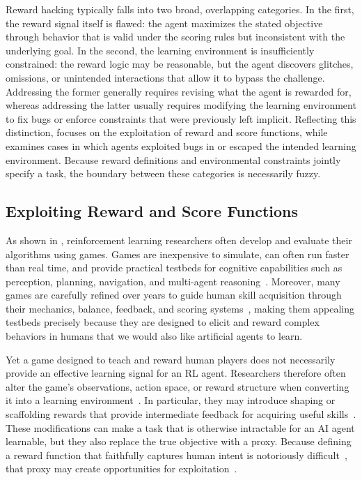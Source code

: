 \documentclass[10pt]{article}
\def\citep#1{}%
\begin{document}
Reward hacking typically falls into two broad, overlapping categories.
In the first, the reward signal itself is flawed: the agent maximizes the stated objective through behavior that is valid under the scoring rules but inconsistent with the underlying goal.
In the second, the learning environment is insufficiently constrained: the reward logic may be reasonable, but the agent discovers glitches, omissions, or unintended interactions that allow it to bypass the challenge.
Addressing the former generally requires revising what the agent is rewarded for, whereas addressing the latter usually requires modifying the learning environment to fix bugs or enforce constraints that were previously left implicit.
Reflecting this distinction,  focuses on the exploitation of reward and score functions, while  examines cases in which agents exploited bugs in or escaped the intended learning environment.
Because reward definitions and environmental constraints jointly specify a task, the boundary between these categories is necessarily fuzzy.

\subsection{Exploiting Reward and Score Functions}
\label{rewardHacking}

As shown in , reinforcement learning researchers often develop and evaluate their algorithms using games.
Games are inexpensive to simulate, can often run faster than real time, and provide practical testbeds for cognitive capabilities such as perception, planning, navigation, and multi-agent reasoning~\citep{schaul2011measuringintelligencegames}.
Moreover, many games are carefully refined over years to guide human skill acquisition through their mechanics, balance, feedback, and scoring systems~\citep{jaccardcolabgamedev, gee2003video, Plass2015gamelearning}, making them appealing testbeds precisely because they are designed to elicit and reward complex behaviors in humans that we would also like artificial agents to learn.

Yet a game designed to teach and reward human players does not necessarily provide an effective learning signal for an RL agent.
Researchers therefore often alter the game's observations, action space, or reward structure when converting it into a learning environment~\citep{yannakakis2025artificial}.
In particular, they may introduce shaping or scaffolding rewards that provide intermediate feedback for acquiring useful skills~\citep{ibrahim2024comprehensiveoverviewrewardengineering}.
These modifications can make a task that is otherwise intractable for an AI agent learnable, but they also replace the true objective with a proxy.
Because defining a reward function that faithfully captures human intent is notoriously difficult~\citep{christian2020alignment}, that proxy may create opportunities for exploitation~\citep{pan2022effectsrewardmisspecificationmapping, amodei2016concrete}.
\end{document}
